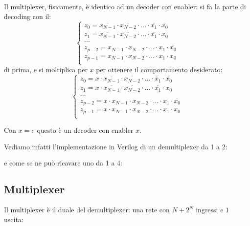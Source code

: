 \documentclass[a4paper,11pt]{article}
\begin{document}
Il multiplexer, fisicamente, è identico ad un decoder con enabler: si fa la parte di decoding con il:
\[
	\begin{cases}
		z_0 = \overline{x_{N-1}} \cdot \overline{x_{N-2}} \cdot ... \cdot \overline{x_1} \cdot \overline{x_0}	\\
		z_1 = \overline{x_{N-1}} \cdot \overline{x_{N-2}} \cdot ... \cdot \overline{x_1} \cdot x_0	\\
		... \\ 
		z_{p-2} = x_{N-1} \cdot x_{N-2} \cdot ... \cdot x_1 \cdot \overline{x_0}	\\
		z_{p-1} = x_{N-1} \cdot x_{N-2} \cdot ... \cdot x_1 \cdot x_0	\\
	\end{cases}
\]
di prima, e si moltiplica per $x$ per ottenere il comportamento desiderato:
\[
	\begin{cases}
		z_0 = x \cdot \overline{x_{N-1}} \cdot \overline{x_{N-2}} \cdot ... \cdot \overline{x}_1 \cdot \overline{x_0}	\\
		z_1 = x \cdot \overline{x_{N-1}} \cdot \overline{x_{N-2}} \cdot ... \cdot \overline{x_1} \cdot x_0	\\
		... \\ 
		z_{p-2} = x \cdot x_{N-1} \cdot x_{N-2} \cdot ... \cdot x_1 \cdot \overline{x_0}	\\
		z_{p-1} = x \cdot x_{N-1} \cdot x_{N-2} \cdot ... \cdot x_1 \cdot x_0	\\
	\end{cases}
\]

Con $x = e$ questo è un decoder con enabler $x$.

Vediamo infatti l'implementazione in Verilog di un demultiplexer da 1 a 2:



e come se ne può ricavare uno da 1 a 4:



\subsection{Multiplexer}
Il multiplexer è il duale del demultiplexer: una rete con $N + 2^N$ ingressi e $1$ uscita:
\end{document}
